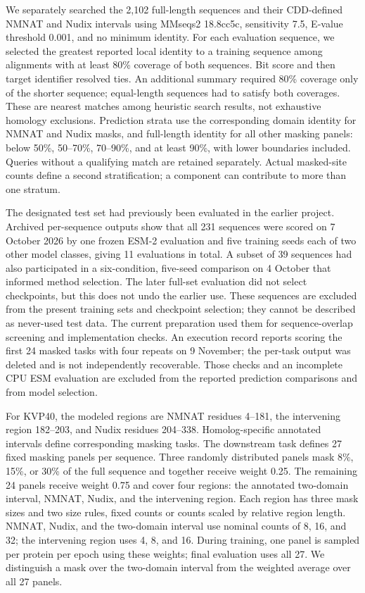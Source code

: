 \documentclass[referee,pdflatex,sn-vancouver-num]{sn-jnl}
\begin{document}
We separately searched the 2,102 full-length sequences and their CDD-defined NMNAT and Nudix intervals using MMseqs2 18.8cc5c, sensitivity 7.5, E-value threshold 0.001, and no minimum identity. For each evaluation sequence, we selected the greatest reported local identity to a training sequence among alignments with at least 80\% coverage of both sequences. Bit score and then target identifier resolved ties. An additional summary required 80\% coverage only of the shorter sequence; equal-length sequences had to satisfy both coverages. These are nearest matches among heuristic search results, not exhaustive homology exclusions. Prediction strata use the corresponding domain identity for NMNAT and Nudix masks, and full-length identity for all other masking panels: below 50\%, 50--70\%, 70--90\%, and at least 90\%, with lower boundaries included. Queries without a qualifying match are retained separately. Actual masked-site counts define a second stratification; a component can contribute to more than one stratum.

The designated test set had previously been evaluated in the earlier project. Archived per-sequence outputs show that all 231 sequences were scored on 7 October 2026 by one frozen ESM-2 evaluation and five training seeds each of two other model classes, giving 11 evaluations in total. A subset of 39 sequences had also participated in a six-condition, five-seed comparison on 4 October that informed method selection. The later full-set evaluation did not select checkpoints, but this does not undo the earlier use. These sequences are excluded from the present training sets and checkpoint selection; they cannot be described as never-used test data. The current preparation used them for sequence-overlap screening and implementation checks. An execution record reports scoring the first 24 masked tasks with four repeats on 9 November; the per-task output was deleted and is not independently recoverable. Those checks and an incomplete CPU ESM evaluation are excluded from the reported prediction comparisons and from model selection.

For KVP40, the modeled regions are NMNAT residues 4--181, the intervening region 182--203, and Nudix residues 204--338. Homolog-specific annotated intervals define corresponding masking tasks. The downstream task defines 27 fixed masking panels per sequence. Three randomly distributed panels mask 8\%, 15\%, or 30\% of the full sequence and together receive weight 0.25. The remaining 24 panels receive weight 0.75 and cover four regions: the annotated two-domain interval, NMNAT, Nudix, and the intervening region. Each region has three mask sizes and two size rules, fixed counts or counts scaled by relative region length. NMNAT, Nudix, and the two-domain interval use nominal counts of 8, 16, and 32; the intervening region uses 4, 8, and 16. During training, one panel is sampled per protein per epoch using these weights; final evaluation uses all 27. We distinguish a mask over the two-domain interval from the weighted average over all 27 panels.
\end{document}
